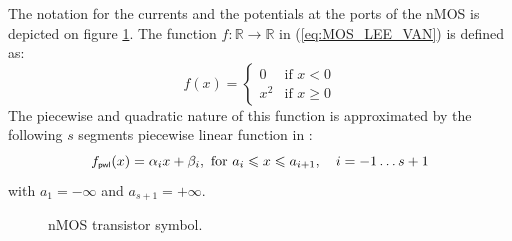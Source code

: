  The notation for the currents and the potentials at the ports of the nMOS is depicted on figure \ref{fig:NMOS}. The function $f :\mathbb{R} \longrightarrow \mathbb{R}$ in (\ref{eq:MOS_LEE_VAN}) is defined as:
\[
f(x) = \left\{ \begin{array}{ll}
0 & \textrm{if $x < 0$}\\
x^2 & \textrm{if $x \geq 0$}
\end{array} \right.
\]
The piecewise and quadratic nature of this function is approximated by the following $s$ segments piecewise linear function in \cite{leenaerts-bokhoven1998}: 
\begin{equation}\label{eq:pwl}
f_\pwl(x) = \alpha_i x + \beta_i, \text{ for } a_i \leq x \leq a_{i+1}, \quad i = -1\ldots s+1
\end{equation}
with $a_1 = -\infty$ and $a_{s+1} = +\infty$.
\begin{figure}
  \centering
  
  \caption{nMOS transistor symbol.}
  \label{fig:NMOS}
\end{figure}

